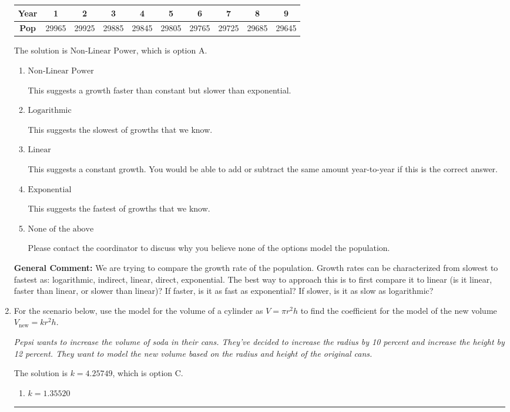 \documentclass{extbook}[14pt]
\newcommand{\litem}[1]{\item #1

\rule{\textwidth}{0.4pt}}
\begin{document}
\begin{enumerate}
{\begin{tabular}{c|c|c|c|c|c|c|c|c|c}
\textbf{Year} &1 &2 &3 &4 &5 &6 &7 &8 &9\tabularnewline \hline
\textbf{Pop} &29965 &29925 &29885 &29845 &29805 &29765 &29725 &29685 &29645\end{tabular}The solution is \( \text{Non-Linear Power} \), which is option A.\begin{enumerate}[label=\Alph*.]
\item \( \text{Non-Linear Power} \)

This suggests a growth faster than constant but slower than exponential.
\item \( \text{Logarithmic} \)

This suggests the slowest of growths that we know.
\item \( \text{Linear} \)

This suggests a constant growth. You would be able to add or subtract the same amount year-to-year if this is the correct answer.
\item \( \text{Exponential} \)

This suggests the fastest of growths that we know.
\item \( \text{None of the above} \)

Please contact the coordinator to discuss why you believe none of the options model the population.
\end{enumerate}

\textbf{General Comment:} We are trying to compare the growth rate of the population. Growth rates can be characterized from slowest to fastest as: logarithmic, indirect, linear, direct, exponential. The best way to approach this is to first compare it to linear (is it linear, faster than linear, or slower than linear)? If faster, is it as fast as exponential? If slower, is it as slow as logarithmic?
}
\litem{
For the scenario below, use the model for the volume of a cylinder as $V = \pi r^2 h$ to find the coefficient for the model of the new volume $V_{\text{new}} = k r^2 h$.

\begin{center}
    \textit{ Pepsi wants to increase the volume of soda in their cans. They've decided to increase the radius by 10 percent and increase the height by 12 percent. They want to model the new volume based on the radius and height of the original cans. }
\end{center}
The solution is \( k = 4.25749 \), which is option C.\begin{enumerate}[label=\Alph*.]
\item \( k = 1.35520 \)


\end{enumerate}}
\end{enumerate}
\end{document}
